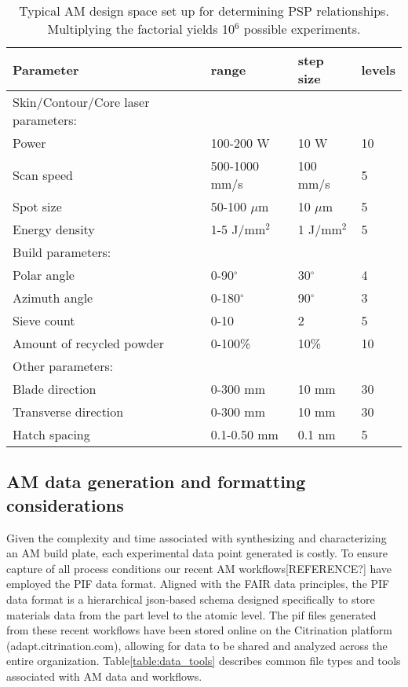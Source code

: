 \begin{table*}
    \renewcommand{\arraystretch}{0.8}
    \setlength{\tabcolsep}{5pt}
    \begin{center}
        \begin{tabular}{@{}llll@{}}
            \toprule
            \hline
             Parameter & range & step size & levels \\ \midrule
            \hline
            \hline
            Skin/Contour/Core laser parameters: & & & \\
            Power & 100-200 W & 10 W & 10 \\
            Scan speed & 500-1000 mm/s & 100 mm/s & 5 \\
            Spot size & 50-100 $\mu$m & 10 $\mu$m & 5 \\
            Energy density & 1-5 J/mm$^2$ & 1 J/mm$^2$ & 5 \\
            \hline
            Build parameters: & & & \\
            Polar angle & 0-90$^\circ$ & 30$^\circ$  & 4 \\
            Azimuth angle & 0-180$^\circ$ & 90$^\circ$  & 3 \\
            Sieve count & 0-10 & 2 & 5 \\
            Amount of recycled powder & 0-100\% & 10\% & 10 \\
            \hline
            Other parameters: & & & \\
            Blade direction & 0-300 mm & 10 mm  & 30 \\
            Transverse direction & 0-300 mm & 10 mm  & 30 \\
            Hatch spacing & 0.1-0.50 mm & 0.1 nm  & 5 \\
            \hline
            \bottomrule
        \end{tabular}
        \caption{Typical AM design space set up for determining PSP relationships. Multiplying the factorial yields 10$^6$ possible experiments.}
        \label{table:design_space}
    \end{center}
\end{table*}

\subsection{AM data generation and formatting considerations}
\label{subsec:DMC_data}
Given the complexity and time associated with synthesizing and characterizing an AM build plate, each experimental data point generated is costly.
To ensure capture of all process conditions our recent AM workflows[REFERENCE?] have employed the PIF data format\cite{Michel2016}.
Aligned with the FAIR data principles\cite{Wilkinson2016}, the PIF data format is a hierarchical json-based schema designed specifically to store materials data from the part level to the atomic level.
The pif files generated from these recent workflows have been stored online on the Citrination platform (adapt.citrination.com), allowing for data to be shared and analyzed across the entire organization.
Table\ref{table:data_tools} describes common file types and tools associated with AM data and workflows.

